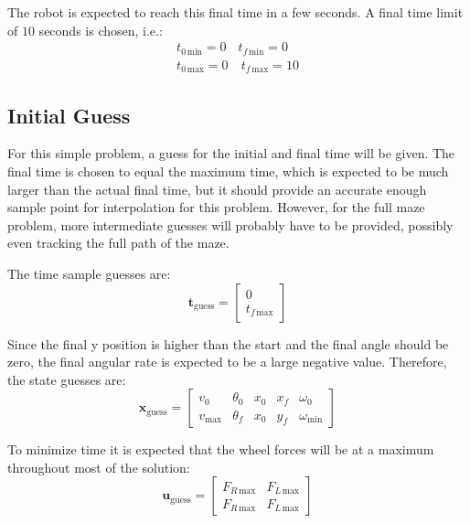 \documentclass[12pt]{article}
\numberwithin{equation}{section} %
\numberwithin{figure}{section} %
\begin{document}
The robot is expected to reach this final time in a few seconds. A final time limit of $10$ seconds is chosen, i.e.:
\begin{equation}
	\begin{matrix}
		t_{0 \, \mathrm{min}} = 0 & t_{f \, \mathrm{min}} = 0 \\
		t_{0 \, \mathrm{max}} = 0 & \ t_{f \, \mathrm{max}} = 10
	\end{matrix} \nonumber
\end{equation}

\subsection{Initial Guess}

For this simple problem, a guess for the initial and final time will be given. The final time is chosen to equal the maximum time, which is expected to be much larger than the actual final time, but it should provide an accurate enough sample point for interpolation for this problem. However, for the full maze problem, more intermediate guesses will probably have to be provided, possibly even tracking the full path of the maze.

The time sample guesses are:
\begin{equation}
	\boldsymbol t_\mathrm{guess} = \begin{bmatrix}
		0 \\ t_{f \, \mathrm{max}}
	\end{bmatrix} \nonumber
\end{equation}

Since the final y position is higher than the start and the final angle should be zero, the final angular rate is expected to be a large negative value. Therefore, the state guesses are:
\begin{equation}
	\boldsymbol{x}_\mathrm{guess} = \begin{bmatrix}
		v_0 & \theta_0 & x_0 & x_f & \omega_0 \\
		v_\mathrm{max} & \theta_f & x_0 & y_f & \omega_\mathrm{min}
	\end{bmatrix} \nonumber
\end{equation}

To minimize time it is expected that the wheel forces will be at a maximum throughout most of the solution:
\begin{equation}
	\boldsymbol{u}_\mathrm{guess} = \begin{bmatrix}
		F_{R \, \mathrm{max}} & F_{L \, \mathrm{max}} \\
		F_{R \, \mathrm{max}} & F_{L \, \mathrm{max}}
	\end{bmatrix} \nonumber
\end{equation}
\end{document}
